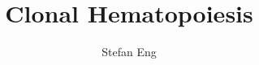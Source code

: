 \documentclass{article}
\title{Clonal Hematopoiesis}
\author{Stefan Eng}
\begin{document}
\maketitle

\nocite{*}



\end{document}
